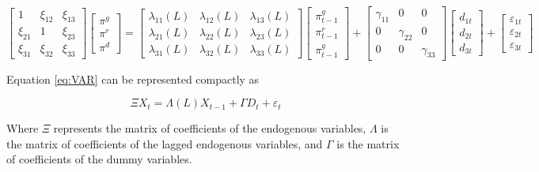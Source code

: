 \documentclass[]{article}
\begin{document}
\small
\begin{equation}
\begin{bmatrix} 1 & \xi_{12} & \xi_{13}\\ 
\xi_{21} & 1 & \xi_{23}\\
\xi_{31} & \xi_{32} & \xi_{33}
\end{bmatrix}
\begin{bmatrix} \pi^{g}\\
\pi^{r}\\
\pi^{d}
\end{bmatrix}=\begin{bmatrix}\lambda_{11}(L) & \lambda_{12}(L) & \lambda_{13}(L)\\
\lambda_{21}(L) & \lambda_{22}(L) & \lambda_{23}(L)\\
\lambda_{31}(L) & \lambda_{32}(L) & \lambda_{33}(L) 
\end{bmatrix}
\begin{bmatrix}\pi_{t-1}^{g}\\ \pi_{t-1}^{r}\\ \pi_{t-1}^{g}
\end{bmatrix}+
\begin{bmatrix}\gamma_{11} & 0 & 0\\
0 & \gamma_{22} & 0\\
0 & 0 & \gamma_{33}
\end{bmatrix}
\begin{bmatrix}d_{1t}\\ d_{2t}\\ d_{3t}
\end{bmatrix} +
\begin{bmatrix} \varepsilon_{1t}\\ \varepsilon_{2t}\\ \varepsilon_{3t}
\end{bmatrix}
\label{eq:VAR}
\end{equation}

\large

Equation \eqref{eq:VAR} can be represented compactly as

\begin{equation}
\Xi X_{t}=\Lambda(L)X_{t-1}+\Gamma D_{t} +\varepsilon_{t} \label{eq:stable-VAR}
\end{equation}

Where \(\Xi\) represents the matrix of coefficients of the endogenous variables, \(\Lambda\) is the matrix of coefficients of the lagged endogenous variables, and \(\Gamma\) is the matrix of coefficients of the dummy variables.
\end{document}
